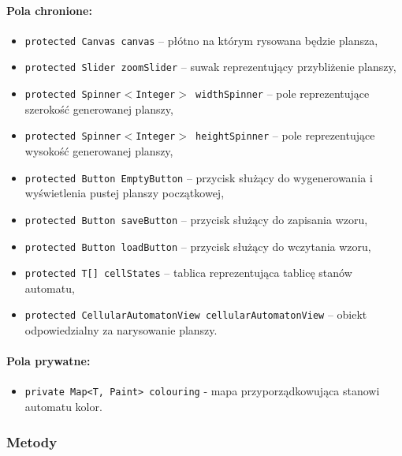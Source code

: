 \documentclass{report}
\begin{document}
\paragraph{Pola chronione:}
\begin{itemize}
	\item \texttt{protected Canvas canvas} -- płótno na którym rysowana będzie plansza,
	\item \texttt{protected Slider zoomSlider} -- suwak reprezentujący przybliżenie planszy,
	\item \texttt{protected Spinner$<$Integer$>$  widthSpinner} -- pole reprezentujące szerokość generowanej planszy,
	\item \texttt{protected Spinner$<$Integer$>$ heightSpinner} -- pole reprezentujące wysokość generowanej planszy,
	\item \texttt{protected Button EmptyButton} -- przycisk służący do wygenerowania i wyświetlenia pustej planszy początkowej,
	\item \texttt{protected Button saveButton} -- przycisk służący do zapisania wzoru,
	\item \texttt{protected Button loadButton} -- przycisk służący do wczytania wzoru,
	\item \texttt{protected T[] cellStates} -- tablica reprezentująca tablicę stanów automatu,
	\item \texttt{protected CellularAutomatonView cellularAutomatonView} -- obiekt odpowiedzialny za narysowanie planszy.
\end{itemize}

\paragraph{Pola prywatne:}
\begin{itemize}
	\item \texttt{private Map<T, Paint> colouring} - mapa przyporządkowująca stanowi automatu kolor.
\end{itemize}
\subsubsection{Metody}
\end{document}
